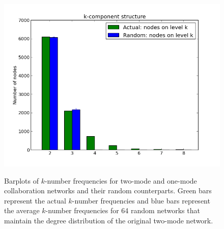 \begin{figure}[p]
{\includegraphics[scale=0.34]{figures/barplot_nucl_th_2mode}
}
\hspace{.05in}
\caption[Barplots of $k$-number frequencies.]{Barplots of $k$-number frequencies for two-mode and one-mode collaboration networks and their random counterparts. Green bars represent the actual $k$-number frequencies and blue bars represent the average $k$-number frequencies for 64 random networks that maintain the degree distribution of the original two-mode network.} 
\label{fig:sc}
\end{figure}

